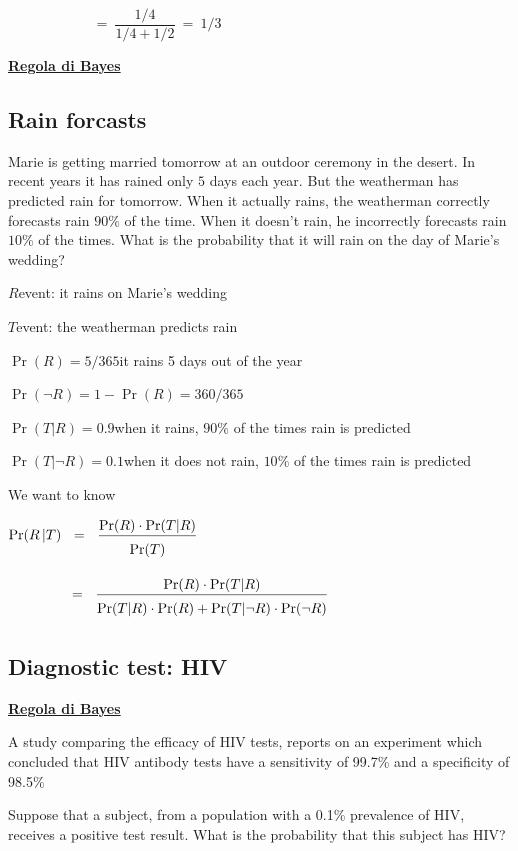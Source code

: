\documentclass[11pt,openany]{book}
\begin{document}
$\phantom{\Pr(C|S_{na})}\ =\ \dfrac{1/4}{1/4+1/2}\ =\ 1/3$


\clearpage\hfill
\textbf{{\color{brown}\hyperref[RegolaBayes]{Regola di Bayes} \faShare}}
\subsection{Rain forcasts}
\label{rain_desert}

Marie is getting married tomorrow at an outdoor ceremony in the desert. In recent years it has rained only $5$ days each year. But the weatherman has predicted rain for tomorrow. When it actually rains, the weatherman correctly forecasts rain $90\%$ of the time. When it doesn’t rain, he incorrectly forecasts rain $10\%$ of the times. What is the probability that it will rain on the day of Marie’s wedding?


$R$\hfill event: it rains on Marie’s wedding

$T$\hfill event: the weatherman predicts rain

$\Pr(R) = 5/365$\hfill it rains 5 days out of the year

$\Pr(\neg R) = 1-\Pr(R)= 360/365$

$\Pr(T|R) = 0.9$\hfill when it rains, $90\%$ of the times rain is predicted

$\Pr(T|\neg R) = 0.1$\hfill when it does not rain, $10\%$ of the times rain is predicted

\bigskip
We want to know

$\displaystyle \Pr(R\,| T)\medrel{=}\frac{\Pr(R)\cdot \Pr(T|R)}{\Pr(T)\vphantom{\Big[}}$

$\displaystyle\hphantom{\Pr(R | T)}\medrel{=}\frac{\Pr(R)\cdot \Pr(T|R)}{\Pr(T|R)\cdot \Pr(R)+ \Pr(T|\neg R)\cdot \Pr(\neg R)\vphantom{\Big[}}$

\clearpage\subsection{Diagnostic test: HIV}
\hfill\textbf{{\color{brown}\hyperref[RegolaBayes]{Regola di Bayes} \faShare}}
\label{HIV_test}

A study comparing the efficacy of HIV tests, reports on an
experiment which concluded that HIV antibody tests have a
{\color{violet}sensitivity of 99.7\%} and a {\color{violet}specificity of 98.5\%}

Suppose that a subject, from a population with a {\color{violet} 0.1\% prevalence}
of HIV, receives a positive test result. What is the probability
that this subject has HIV?
\end{document}
